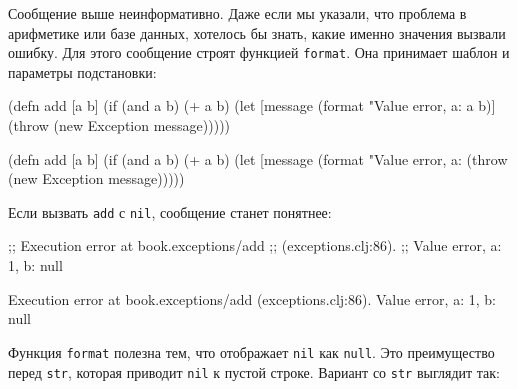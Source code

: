 \fi

Сообщение выше неинформативно. Даже если мы указали, что проблема в арифметике
или базе данных, хотелось бы знать, какие именно значения вызвали ошибку. Для
этого сообщение строят функцией \verb|format|. Она принимает шаблон и
параметры подстановки:


\ifx\devicetype\mobile

\begin{english}
  \begin{clojure}
(defn add [a b]
  (if (and a b)
    (+ a b)
    (let [message
          (format
            "Value error, a: %
            a b)]
      (throw (new Exception message)))))
  \end{clojure}
\end{english}

\else

\begin{english}
  \begin{clojure}
(defn add [a b]
  (if (and a b)
    (+ a b)
    (let [message (format "Value error, a: %
      (throw (new Exception message)))))
  \end{clojure}
\end{english}

\fi

\noindent
Если вызвать \verb|add| с \verb|nil|, сообщение станет понятнее:

\ifx\devicetype\mobile

\begin{english}
  \begin{clojure}
;; Execution error at book.exceptions/add
;; (exceptions.clj:86).
;; Value error, a: 1, b: null
  \end{clojure}
\end{english}

\else

\begin{english}
  \begin{clojure}
Execution error at book.exceptions/add (exceptions.clj:86).
Value error, a: 1, b: null
  \end{clojure}
\end{english}

\fi

Функция \verb|format| полезна тем, что отображает \verb|nil| как
\verb|null|. Это преимущество перед \verb|str|, которая приводит
\verb|nil| к пустой строке. Вариант со \verb|str| выглядит так:

